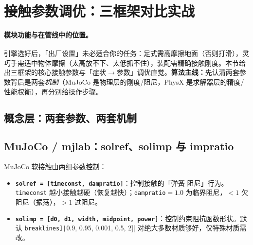\section{接触参数调优：三框架对比实战}
\label{sec:rlmc-phys-tuning}

\paragraph{模块功能与在管线中的位置。}引擎选好后，「出厂设置」未必适合你的任务：足式需高摩擦地面（否则打滑），灵巧手需适中物体摩擦（太高放不下、太低抓不住），装配需精确接触刚度。本节给出三框架的核心接触参数与「症状$\to$参数」调优直觉。\textbf{算法主线：}先认清两套参数背后是两套\emph{机制}（MuJoCo 是物理层的刚度/阻尼，PhysX 是求解器层的精度/性能权衡），再分别给操作步骤。

\subsection{概念层：两套参数、两套机制}


\subsection{MuJoCo / mjlab：solref、solimp 与 impratio}

MuJoCo 软接触由两组参数控制：

\begin{itemize}
  \item \textbf{\texttt{solref = [timeconst, dampratio]}}：控制接触的「弹簧-阻尼」行为。\verb|timeconst| 越小接触越硬（恢复越快）；\verb|dampratio|$=1.0$ 为临界阻尼，$<1$ 欠阻尼（振荡），$>1$ 过阻尼。
  \item \textbf{\texttt{solimp = [d0, d1, width, midpoint, power]}}：控制约束阻抗函数形状。默认 \Verb[breaklines]|[0.9, 0.95, 0.001, 0.5, 2]| 对绝大多数材质够好，仅特殊材质需改。
\end{itemize}

